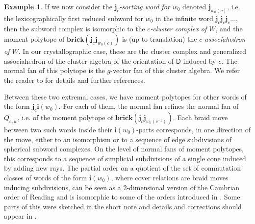 \documentclass[a4paper, 11pt]{amsart}
\newcommand{\brick}{\mathbf{brick}}
\newcommand{\word}[1]{\mathbf{#1}}
\newcommand{\dynkin}{\mathsf{D}}
\theoremstyle{definition}
\newtheorem{example}[theorem]{Example}
\begin{document}
\begin{example}
If we now consider the \emph{$\word{j}_{c}$-sorting word for $w_0$} denoted $\word{j}_{w_0(c)}$, i.e. the lexicographically first reduced subword for $w_0$ in the infinite word $\word{j}_{c}\word{j}_{c}\word{j}_{c}\ldots$, then the subword complex is isomorphic to the \emph{$c$-cluster complex of $W$}, and the moment polytope of $\brick(\word{j}_c \word{j}_{w_0(c)})$ is (up to translation) the \emph{$c$-associahedron of $W$}. In our crystallographic case, these are the  cluster complex and generalized associahedron of the cluster algebra of the orientation of $\dynkin$ induced by $c$. The normal fan of this polytope is the $g$-vector fan of this cluster algebra. We refer the reader to \cite{pilaud_stump_15, JLS, PSZ} for details and further references.

Between these two extremal cases, we have moment polytopes for other words of the form $\word{j}_c\word{i}(w_0)$. For each of them, the normal fan refines the normal fan of $Q_{e,w}$, i.e. of the moment polytope of $\brick(\word{j}_c \word{j}_{w_0(c^{-1})})$. Each braid move between two such words inside their $\word{i}(w_0)$-parts corresponds, in one direction of the move,  either to an isomorphism or to a sequence of edge subdivisions of spherical subword complexes. On the level of normal fans of moment polytopes, this corresponds to a sequence of simplicial subdivisions of a single cone induced by adding new rays. The partial order on a quotient of the set of commutation classes of words of the form $\word{i}(w_0)$, where cover relations are braid moves inducing subdivisions, can be seen as a 2-dimensional version of the Cambrian order of Reading and is isomorphic to some of the orders introduced in \cite{GW1, GW2}. Some parts of this were sketched in the short note \cite{G_subword_1} and details and corrections should appear in \cite{GW_upcoming}.
\end{example}
\end{document}
